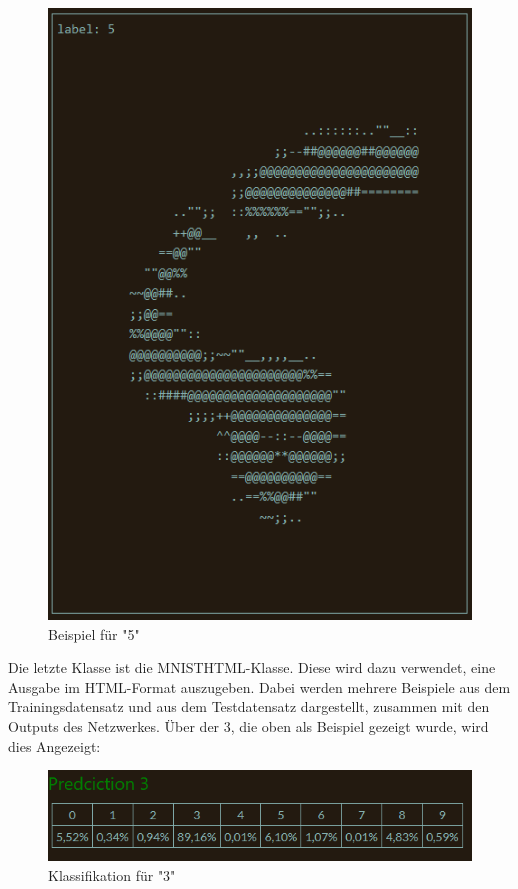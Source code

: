\documentclass[12pt]{article}
\begin{document}
\begin{figure}[H]
\centering
\includegraphics[scale=0.60]{./Images/Pasted image 20231001133317.png}
\caption{Beispiel für "5"}
\label{Beispiel für "5"}
\end{figure}
Die letzte Klasse ist die MNISTHTML-Klasse. Diese wird dazu verwendet, eine Ausgabe im HTML-Format auszugeben. Dabei werden mehrere Beispiele aus dem Trainingsdatensatz und aus dem Testdatensatz dargestellt, zusammen mit den Outputs des Netzwerkes.
Über der 3, die oben als Beispiel gezeigt wurde, wird dies Angezeigt:\begin{figure}[H]
\centering
\includegraphics[scale=0.60]{./Images/Pasted image 20231001133707.png}
\caption{Klassifikation für "3"}
\label{Klassifikation für "3"}
\end{figure}
\end{document}
